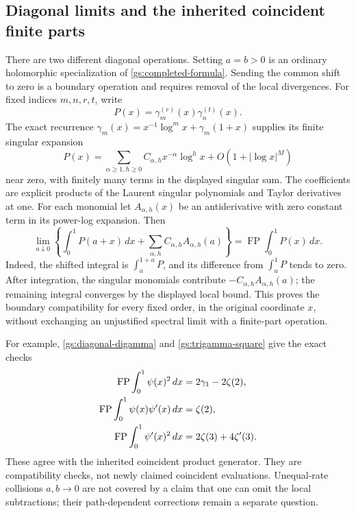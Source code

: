 \subsection{Diagonal limits and the inherited coincident finite parts}

There are two different diagonal operations.  Setting $a=b>0$
is an ordinary holomorphic specialization of
\eqref{gs:completed-formula}.  Sending the common shift to zero is
a boundary operation and requires removal of the local divergences.
For fixed indices $m,n,r,t$, write
\[
 P(x)=\gamma_m^{(r)}(x)\gamma_n^{(t)}(x).
\]
The exact recurrence
$\gamma_m(x)=x^{-1}\log^m x+\gamma_m(1+x)$ supplies its finite
singular expansion
\[
 P(x)=\sum_{\alpha\ge1,h\ge0}C_{\alpha,h}x^{-\alpha}\log^h x
           +O(1+|\log x|^M)
\]
near zero, with finitely many terms in the displayed singular sum.
The coefficients are explicit products of the Laurent singular
polynomials and Taylor derivatives at one.  For each monomial let
$A_{\alpha,h}(x)$ be an antiderivative with zero constant term in
its power-log expansion.  Then
\begin{equation}\label{gs:boundary-limit}
 \lim_{a\downarrow0}\left\{
 \int_0^1P(a+x)\,dx
       +\sum_{\alpha,h}C_{\alpha,h}A_{\alpha,h}(a)\right\}
 =\operatorname{FP}\int_0^1P(x)\,dx.
\end{equation}
Indeed, the shifted integral is $\int_a^{1+a}P$, and its difference
from $\int_a^1P$ tends to zero.  After integration, the singular
monomials contribute $-C_{\alpha,h}A_{\alpha,h}(a)$; the remaining
integral converges by the displayed local bound.  This proves the
boundary compatibility for every fixed order, in the original
coordinate $x$, without exchanging an unjustified spectral limit
with a finite-part operation.

For example, \eqref{gs:diagonal-digamma} and
\eqref{gs:trigamma-square} give the exact checks
\begin{align}
 \operatorname{FP}\int_0^1\psi(x)^2\,dx
     &=2\gamma_1-2\zeta(2),\notag\\
 \operatorname{FP}\int_0^1\psi(x)\psi'(x)\,dx
     &=\zeta(2),\notag\\
 \operatorname{FP}\int_0^1\psi'(x)^2\,dx
     &=2\zeta(3)+4\zeta'(3).
 \label{gs:boundary-checks}
\end{align}
These agree with the inherited coincident product generator.  They
are compatibility checks, not newly claimed coincident evaluations.
Unequal-rate collisions $a,b\to0$ are not covered by a claim that
one can omit the local subtractions; their path-dependent corrections
remain a separate question.

